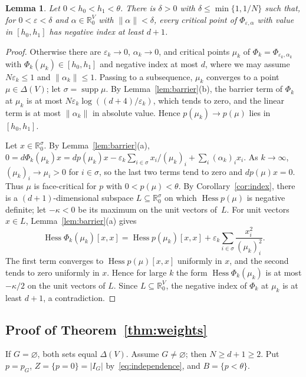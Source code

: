 \documentclass[11pt]{article}
\newtheorem{lemma}[theorem]{Lemma}
\theoremstyle{definition}
\numberwithin{equation}{section}
\newcommand{\R}{\mathbb R}
\DeclareMathOperator{\supp}{supp}
\DeclareMathOperator{\Hess}{Hess}
\begin{document}
\begin{lemma}\label{lem:persistence}
Let $0<h_0<h_1<\theta$. There is $\delta>0$ with $\delta\le\min\{1,1/N\}$ such that, for $0<\varepsilon<\delta$ and $\alpha\in\R^V_0$ with $\|\alpha\|<\delta$, every critical point of $\Phi_{\varepsilon,\alpha}$ with value in $[h_0,h_1]$ has negative index at least $d+1$.
\end{lemma}
\begin{proof}
Otherwise there are $\varepsilon_k\to0$, $\alpha_k\to0$, and critical points $\mu_k$ of $\Phi_k=\Phi_{\varepsilon_k,\alpha_k}$ with $\Phi_k(\mu_k)\in[h_0,h_1]$ and negative index at most $d$, where we may assume $N\varepsilon_k\le1$ and $\|\alpha_k\|\le1$. Passing to a subsequence, $\mu_k$ converges to a point $\mu\in\Delta(V)$; let $\sigma=\supp\mu$. By Lemma~\ref{lem:barrier}(b), the barrier term of $\Phi_k$ at $\mu_k$ is at most $N\varepsilon_k\log((d+4)/\varepsilon_k)$, which tends to zero, and the linear term is at most $\|\alpha_k\|$ in absolute value. Hence $p(\mu_k)\to p(\mu)$ lies in $[h_0,h_1]$.

Let $x\in\R^\sigma_0$. By Lemma~\ref{lem:barrier}(a), $0=d\Phi_k(\mu_k)x=dp(\mu_k)x-\varepsilon_k\sum_{i\in\sigma}x_i/(\mu_k)_i+\sum_i(\alpha_k)_ix_i$. As $k\to\infty$, $(\mu_k)_i\to\mu_i>0$ for $i\in\sigma$, so the last two terms tend to zero and $dp(\mu)x=0$. Thus $\mu$ is face-critical for $p$ with $0<p(\mu)<\theta$. By Corollary~\ref{cor:index}, there is a $(d+1)$-dimensional subspace $L\subseteq\R^\sigma_0$ on which $\Hess p(\mu)$ is negative definite; let $-\kappa<0$ be its maximum on the unit vectors of~$L$. For unit vectors $x\in L$, Lemma~\ref{lem:barrier}(a) gives
\begin{equation*}
 \Hess\Phi_k(\mu_k)[x,x]=\Hess p(\mu_k)[x,x]+\varepsilon_k\sum_{i\in\sigma}\frac{x_i^2}{(\mu_k)_i^2}.
\end{equation*}
The first term converges to $\Hess p(\mu)[x,x]$ uniformly in $x$, and the second tends to zero uniformly in $x$. Hence for large $k$ the form $\Hess\Phi_k(\mu_k)$ is at most $-\kappa/2$ on the unit vectors of $L$. Since $L\subseteq\R^V_0$, the negative index of $\Phi_k$ at $\mu_k$ is at least $d+1$, a contradiction.
\end{proof}

\subsection{Proof of Theorem~\ref{thm:weights}}

If $G=\varnothing$, both sets equal $\Delta(V)$. Assume $G\ne\varnothing$; then $N\ge d+1\ge2$. Put $p=p_G$, $Z=\{p=0\}=|I_G|$ by~\eqref{eq:independence}, and $B=\{p<\theta\}$.
\end{document}
